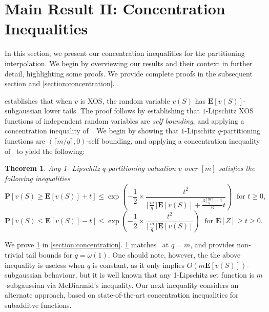 \documentclass[11pt]{article}\usepackage{amsfonts}
\newtheorem{theorem}{Theorem}
\numberwithin{theorem}{subsection}
\newcommand{\prob}{\mathbf{P}}
\newcommand{\expect}{\mathbf{E}}
\begin{document}
\section{Main Result II: Concentration Inequalities}
\label{section:introconcentration}

In this section, we present our concentration inequalities for the partitioning interpolation. We begin by overviewing our results and their context in further detail, highlighting some proofs. We provide complete proofs in the subsequent section and 
\cref{section:concentration}.
.

\cite{Vondrak10} establishes that when $v$ is XOS, the random variable $v(S)$ has $\expect[v(S)]$-subgaussian lower tails. The proof follows by establishing that $1$-Lipschitz XOS functions of independent random variables are \emph{self bounding}, and applying a concentration inequality of~\cite{BoucheronLM00}. We begin by showing that $1$-Lipschitz $q$-partitioning functions are $(\lceil m/q\rceil,0)$-self bounding, and applying a concentration inequality of~\cite{McDiarmidR06,BoucheronLM09} to yield the following:

\begin{theorem}
\label{thm:selfboundingqpart}
Any 1- Lipschitz $q$-partitioning valuation $v$ over $[m]$ satisfies the following inequalities
$$
\prob\left[v(S)\ge \expect[v(S)] + t\right]\le
\exp\left(-\frac{1}{2}\times\frac{t^2}{\lceil\frac{m}{q}\rceil \expect[v(S)] + \frac{3\lceil \frac{m}{q}\rceil-1}{6}t}\right)\;\text { for }t\ge 0,
$$
$$
\prob[v(S)\le \expect[v(S)] - t]\le
\exp\left(-\frac{1}{2}\times\frac{t^2}{\lceil\frac{m}{q}\rceil \expect[v(S)]}\right)\;\text{ for }\expect[Z]\ge t\ge 0.
$$
\end{theorem}

We prove \cref{thm:selfboundingqpart} in \cref{section:concentration}. \cref{thm:selfboundingqpart} matches~\cite{Vondrak10} at $q=m$, and provides non-trivial tail bounds for $q = \omega(1)$. One should note, however, the the above inequality is useless when $q$ is constant, as it only implies $O(m\expect[v(S)])$-subgaussian behaviour, but it is well known that any 1-Lipschitz set function is $m$-subgaussian via McDiarmid's inequality. Our next inequality considers an alternate approach, based on state-of-the-art concentration inequalities for subadditve functions.\\
\end{document}
